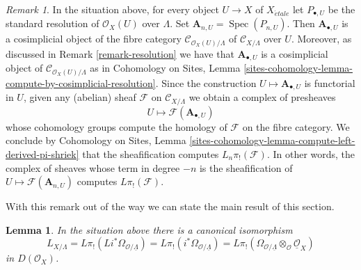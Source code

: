 \documentclass{stacks-project}
\theoremstyle{plain}
\newtheorem{lemma}[subsection]{Lemma}
\theoremstyle{definition}
\theoremstyle{remark}
\newtheorem{remark}[subsection]{Remark}
\numberwithin{equation}{subsection}
\def\Spec{\mathop{\mathrm{Spec}}}
\def\etale{{\acute{e}tale}}
\begin{document}
\begin{remark}
\label{remark-compute-L-pi-shriek-spaces}
In the situation above, for every object $U \to X$ of $X_\etale$
let $P_{\bullet, U}$ be the standard resolution of $\mathcal{O}_X(U)$
over $\Lambda$. Set $\mathbf{A}_{n, U} = \Spec(P_{n, U})$.
Then $\mathbf{A}_{\bullet, U}$
is a cosimplicial object of the fibre category
$\mathcal{C}_{\mathcal{O}_X(U)/\Lambda}$ of
$\mathcal{C}_{X/\Lambda}$ over $U$. Moreover, as discussed
in Remark \ref{remark-resolution} we have that $\mathbf{A}_{\bullet, U}$
is a cosimplicial object of $\mathcal{C}_{\mathcal{O}_X(U)/\Lambda}$
as in Cohomology on Sites, Lemma
\ref{sites-cohomology-lemma-compute-by-cosimplicial-resolution}.
Since the construction $U \mapsto \mathbf{A}_{\bullet, U}$ is functorial
in $U$, given any (abelian) sheaf $\mathcal{F}$ on $\mathcal{C}_{X/\Lambda}$
we obtain a complex of presheaves
$$
U \longmapsto \mathcal{F}(\mathbf{A}_{\bullet, U})
$$
whose cohomology groups compute the homology of $\mathcal{F}$ on the fibre
category. We conclude by
Cohomology on Sites, Lemma
\ref{sites-cohomology-lemma-compute-left-derived-pi-shriek}
that the sheafification computes $L_n\pi_!(\mathcal{F})$.
In other words, the complex of sheaves whose term in degree $-n$ is
the sheafification of $U \mapsto \mathcal{F}(\mathbf{A}_{n, U})$ computes
$L\pi_!(\mathcal{F})$.
\end{remark}

\noindent
With this remark out of the way we can state the main
result of this section.

\begin{lemma}
\label{lemma-cotangent-morphism-spaces}
In the situation above there is a canonical isomorphism
$$
L_{X/\Lambda} = 
L\pi_!(Li^*\Omega_{\mathcal{O}/\underline{\Lambda}}) =
L\pi_!(i^*\Omega_{\mathcal{O}/\underline{\Lambda}}) =
L\pi_!(\Omega_{\mathcal{O}/\underline{\Lambda}}
\otimes_\mathcal{O} \underline{\mathcal{O}}_X)
$$
in $D(\mathcal{O}_X)$.
\end{lemma}
\end{document}
